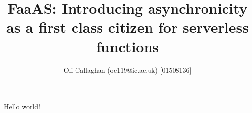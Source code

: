 \documentclass[a4paper,twocolumn]{article}
\title{\textbf{FaaAS: Introducing asynchronicity as a first class citizen for serverless functions}}
\author{Oli Callaghan (oe119@ic.ac.uk) [01508136]}
\begin{document}
\maketitle

Hello world!

\printbibliography
\end{document}
